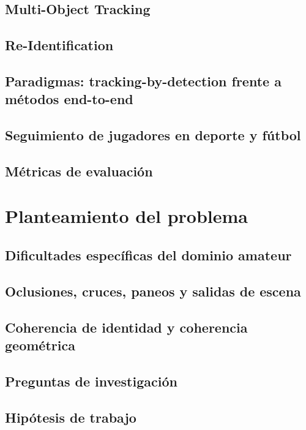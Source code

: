 \documentclass[12pt, a4paper, twoside]{article}
\begin{document}
	\subsection{Multi-Object Tracking}
	\subsection{Re-Identification}
	\subsection{Paradigmas: tracking-by-detection frente a métodos end-to-end}
	\subsection{Seguimiento de jugadores en deporte y fútbol}
	\subsection{Métricas de evaluación}
	
	\newpage
	
	
	\section{Planteamiento del problema}
	
	\subsection{Dificultades específicas del dominio amateur}
	\subsection{Oclusiones, cruces, paneos y salidas de escena}
	\subsection{Coherencia de identidad y coherencia geométrica}
	\subsection{Preguntas de investigación}
	\subsection{Hipótesis de trabajo}
	
\end{document}

